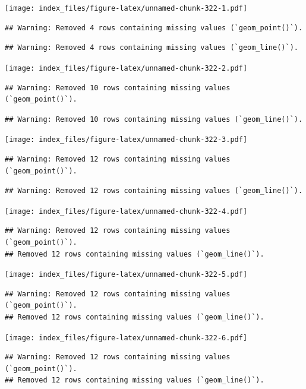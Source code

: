 \documentclass[
]{article}
\begin{document}
\texttt{[image: index\_files/figure-latex/unnamed-chunk-322-1.pdf]}

\begin{verbatim}
## Warning: Removed 4 rows containing missing values (`geom_point()`).
\end{verbatim}

\begin{verbatim}
## Warning: Removed 4 rows containing missing values (`geom_line()`).
\end{verbatim}

\texttt{[image: index\_files/figure-latex/unnamed-chunk-322-2.pdf]}

\begin{verbatim}
## Warning: Removed 10 rows containing missing values (`geom_point()`).
\end{verbatim}

\begin{verbatim}
## Warning: Removed 10 rows containing missing values (`geom_line()`).
\end{verbatim}

\texttt{[image: index\_files/figure-latex/unnamed-chunk-322-3.pdf]}

\begin{verbatim}
## Warning: Removed 12 rows containing missing values (`geom_point()`).
\end{verbatim}

\begin{verbatim}
## Warning: Removed 12 rows containing missing values (`geom_line()`).
\end{verbatim}

\texttt{[image: index\_files/figure-latex/unnamed-chunk-322-4.pdf]}

\begin{verbatim}
## Warning: Removed 12 rows containing missing values (`geom_point()`).
## Removed 12 rows containing missing values (`geom_line()`).
\end{verbatim}

\texttt{[image: index\_files/figure-latex/unnamed-chunk-322-5.pdf]}

\begin{verbatim}
## Warning: Removed 12 rows containing missing values (`geom_point()`).
## Removed 12 rows containing missing values (`geom_line()`).
\end{verbatim}

\texttt{[image: index\_files/figure-latex/unnamed-chunk-322-6.pdf]}

\begin{verbatim}
## Warning: Removed 12 rows containing missing values (`geom_point()`).
## Removed 12 rows containing missing values (`geom_line()`).
\end{verbatim}
\end{document}
